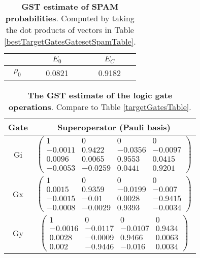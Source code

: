 {\begin{table}[h]
\begin{center}
\begin{tabular}[l]{|c|c|c|}
\hline
 & $E_{0}$ & $E_C$ \\ \hline
$\rho_{0}$ & 0.0821 & 0.9182 \\ \hline
\end{tabular}

\caption{\textbf{GST estimate of SPAM probabilities}.  Computed by taking the dot products of vectors in Table \ref{bestTargetGatesGatesetSpamTable}.\label{bestTargetGatesGatesetSpamParametersTable}}
\end{center}
\end{table}

\begin{table}[h]
\begin{center}
\begin{tabular}[l]{|c|c|}
\hline
Gate & Superoperator (Pauli basis) \\ \hline
Gi & $ \left(\!\!\begin{array}{cccc}
1 & 0 & 0 & 0 \\ 
-0.0011 & 0.9422 & -0.0356 & -0.0097 \\ 
0.0096 & 0.0065 & 0.9553 & 0.0415 \\ 
-0.0053 & -0.0259 & 0.0441 & 0.9201
 \end{array}\!\!\right) $
 \\ \hline
Gx & $ \left(\!\!\begin{array}{cccc}
1 & 0 & 0 & 0 \\ 
0.0015 & 0.9359 & -0.0199 & -0.007 \\ 
-0.0015 & -0.01 & 0.0028 & -0.9415 \\ 
-0.0008 & -0.0029 & 0.9393 & -0.0034
 \end{array}\!\!\right) $
 \\ \hline
Gy & $ \left(\!\!\begin{array}{cccc}
1 & 0 & 0 & 0 \\ 
-0.0016 & -0.0117 & -0.0107 & 0.9434 \\ 
0.0028 & -0.0009 & 0.9466 & 0.0063 \\ 
0.002 & -0.9446 & -0.016 & 0.0034
 \end{array}\!\!\right) $
 \\ \hline
\end{tabular}

\caption{\textbf{The GST estimate of the logic gate operations}.  Compare to Table \ref{targetGatesTable}.\label{bestTargetGatesGatesetGatesTable}}
\end{center}
\end{table}

}

